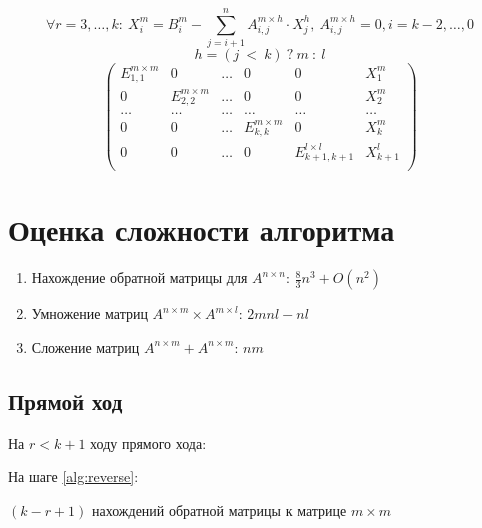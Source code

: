\documentclass[12pt]{report}
\begin{document}
        \[ \forall r = 3, \ldots, k:\ X_{i}^{m} = B_{i}^{m} - \sum_{j = i + 1}^{n} A^{m \times h}_{i, j} \cdot X^{h}_{j},\ A^{m \times h}_{i, j} = 0, i = k - 2, \ldots, 0\]
        \[h = (j\ <\ k )\ ?\ m\ :\ l \]
        \[
        \left(
        \begin{array}{ccccc|c}
            E_{1,1}^{m \times m} & 0                    & \ldots & 0                      & 0                         & X^{m}_{1}   \\  
            0                    & E_{2,2}^{m \times m} & \ldots & 0                      & 0                         & X^{m}_{2}   \\  
            \ldots               & \ldots               & \ldots & \ldots                 & \ldots                    & \ldots      \\  
            0                    & 0                    & \ldots & E_{k,k}^{m \times m  } & 0                         & X^{m}_{k}   \\  
            0                    & 0                    & \ldots & 0                      & E_{k+1, k+1}^{l \times l} & X^{l}_{k+1} \\  
        \end{array}
        \right)
        \]
    
        \section{Оценка сложности алгоритма} \label{lin:compl}
        \begin{enumerate}
            \item Нахождение обратной матрицы для $A^{n \times n}$: $\frac{8}{3}n^3 + O(n^2)$
            \item Умножение матриц $A^{n \times m} \times A^{m \times l}$: $2mnl - nl$
            \item Сложение матриц $A^{n \times m} + A^{n \times m}$: $nm$
        \end{enumerate}

        \subsection{Прямой ход}
        
        На $r < k + 1$ ходу прямого хода:

        На шаге \ref{alg:reverse}: \par
            \quad $(k - r + 1)$ нахождений обратной матрицы к матрице $m \times m$
        
\end{document}
